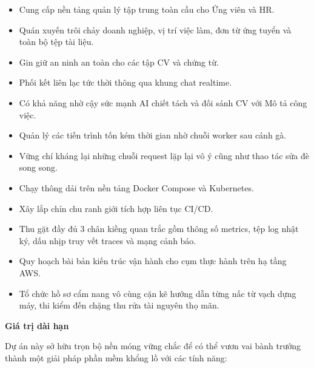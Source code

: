 \begin{itemize}
\tightlist
\item
  Cung cấp nền tảng quản lý tập trung toàn cầu cho Ứng viên và HR.
\item
  Quán xuyến trôi chảy doanh nghiệp, vị trí việc làm, đơn từ ứng tuyển
  và toàn bộ tệp tài liệu.
\item
  Gin giữ an ninh an toàn cho các tập CV và chứng từ.
\item
  Phối kết liên lạc tức thời thông qua khung chat realtime.
\item
  Có khả năng nhờ cậy sức mạnh AI chiết tách và đối sánh CV với Mô tả
  công việc.
\item
  Quản lý các tiến trình tốn kém thời gian nhờ chuỗi worker sau cánh gà.
\item
  Vững chí kháng lại những chuỗi request lặp lại vô ý cũng như thao tác
  sửa đè song song.
\item
  Chạy thông dải trên nền tảng Docker Compose và Kubernetes.
\item
  Xây lắp chỉn chu ranh giới tích hợp liên tục CI/CD.
\item
  Thu gặt đầy đủ 3 chân kiềng quan trắc gồm thông số metrics, tệp log
  nhật ký, dấu nhịp truy vết traces và mạng cảnh báo.
\item
  Quy hoạch bài bản kiến trúc vận hành cho cụm thực hành trên hạ tầng
  AWS.
\item
  Tổ chức hồ sơ cẩm nang vô cùng cặn kẽ hướng dẫn từng nấc từ vạch dựng
  máy, thi kiểm đến chặng thu rửa tài nguyên thọ mãn.
\end{itemize}

\vspace{0.5em}\noindent\textbf{Giá trị dài hạn}\par

Dự án này sở hữu trọn bộ nền móng vững chắc để có thể vươn vai bành
trướng thành một giải pháp phần mềm khổng lồ với các tính năng:

